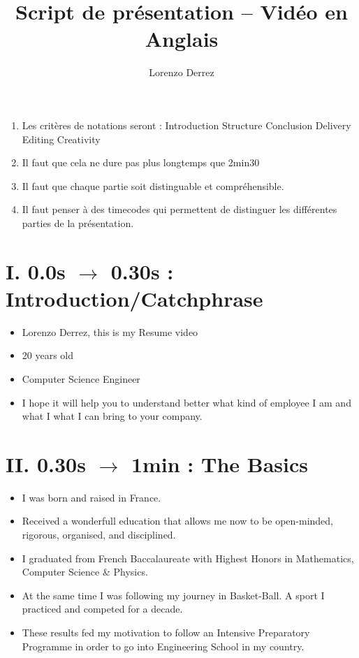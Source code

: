 \documentclass{article}
\title{\textbf{Script de présentation -- Vidéo en Anglais}}
\author{Lorenzo Derrez}
\begin{document}
\maketitle


\begin{enumerate}
    \item Les critères de notations seront : 
    \subitem Introduction
    \subitem Structure
    \subitem Conclusion
    \subitem Delivery
    \subitem Editing
    \subitem Creativity
    \item Il faut que cela ne dure pas plus longtemps que 2min30 
    \item Il faut que chaque partie soit distinguable et compréhensible. 
    \item Il faut penser à des timecodes qui permettent de distinguer les différentes parties de la présentation.
\end{enumerate}


\section*{\textbf{I. 0.0s $\longrightarrow$ 0.30s : Introduction/Catchphrase}}

\begin{itemize}
    \item Lorenzo Derrez, this is my Resume video 
    \item 20 years old
    \item Computer Science Engineer
    \item I hope it will help you to understand better what kind of employee I am and what I what I can bring to your company. 
\end{itemize}

\section*{\textbf{II. 0.30s $\longrightarrow$ 1min : The Basics}}

\begin{itemize}
    \item I was born and raised in France. 
    \item Received a wonderfull education that allows me now to be open-minded, rigorous, organised, and disciplined. 
    \item I graduated from French Baccalaureate with Highest Honors in Mathematics, Computer Science \& Physics.
    \item At the same time I was following my journey in Basket-Ball. A sport I practiced and competed for a decade.
    \item These results fed my motivation to follow an Intensive Preparatory Programme in order to go into Engineering School in my country.
\end{itemize}
\end{document}
